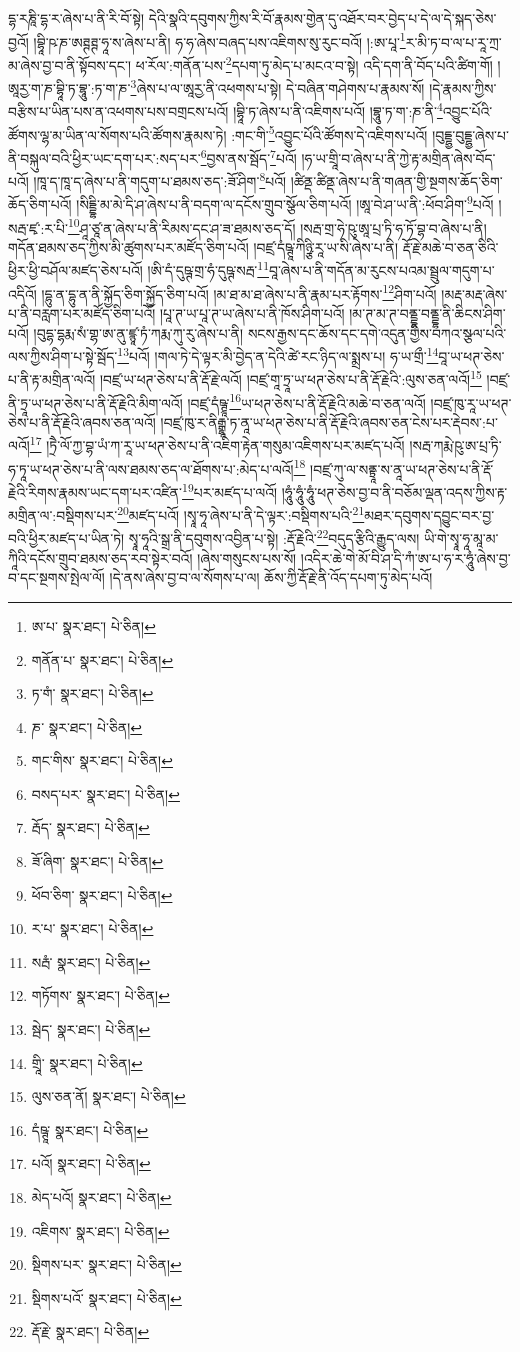 དྷ་རཎཱི་དྷ་ར་ཞེས་པ་ནི་རི་བོ་སྟེ། དེའི་སྣའི་དབུགས་ཀྱིས་རི་བོ་རྣམས་གྱེན་དུ་འཐོར་བར་བྱེད་པ་དེ་ལ་དེ་སྐད་ཅེས་བྱའོ། །བྷཱི་ཥ་ཎ་ཨཊྚཊྚ་ཧཱ་ས་ཞེས་པ་ནི། ཧ་ཧ་ཞེས་བཞད་པས་འཇིགས་སུ་རུང་བའོ། །:ཨ་པཱ་\footnote{ཨ་པ་  སྣར་ཐང་།  པེ་ཅིན། }ར་མི་ཏ་བ་ལ་པ་རཱ་ཀྲ་མ་ཞེས་བྱ་བ་ནི་སྟོབས་དང་། ཕ་རོལ་:གནོན་པས་\footnote{གནོན་པ་  སྣར་ཐང་།  པེ་ཅིན། }དཔག་ཏུ་མེད་པ་མངའ་བ་སྟེ། འདི་དག་ནི་བོད་པའི་ཚིག་གོ། །ཨཱརྱ་ག་ཎ་བྷཱི་ཏ་བྷཱུ་:ཏ་ག་ཎ་\footnote{ཏ་གཾ་  སྣར་ཐང་།  པེ་ཅིན། }ཞེས་པ་ལ་ཨཱརྱ་ནི་འཕགས་པ་སྟེ། དེ་བཞིན་གཤེགས་པ་རྣམས་སོ། །དེ་རྣམས་ཀྱིས་བརྩིས་པ་ཡིན་པས་ན་འཕགས་པས་བགྲངས་པའོ། །བྷཱི་ཏ་ཞེས་པ་ནི་འཇིགས་པའོ། །བྷཱུ་ཏ་ག་:ཎ་ནི་\footnote{ཎ་  སྣར་ཐང་།  པེ་ཅིན། }འབྱུང་པོའི་ཚོགས་ལྷ་མ་ཡིན་ལ་སོགས་པའི་ཚོགས་རྣམས་ཏེ། :གང་གི་\footnote{གང་གིས་  སྣར་ཐང་།  པེ་ཅིན། }འབྱུང་པོའི་ཚོགས་དེ་འཇིགས་པའོ། །བུདྡྷྱ་བུདྡྷྱ་ཞེས་པ་ནི་བསྐུལ་བའི་ཕྱིར་ཡང་དག་པར་:སད་པར་\footnote{བསད་པར་  སྣར་ཐང་།  པེ་ཅིན། }བྱས་ནས་སྦོད་\footnote{རྦོད་  སྣར་ཐང་།  པེ་ཅིན། }པའོ། །ཧ་ཡ་གྲཱི་བ་ཞེས་པ་ནི་ཀྱེ་རྟ་མགྲིན་ཞེས་བོད་པའོ། །ཁཱ་ད་ཁཱ་ད་ཞེས་པ་ནི་གདུག་པ་ཐམས་ཅད་:ཟོ་ཤིག་\footnote{ཟོ་ཞིག་  སྣར་ཐང་།  པེ་ཅིན། }པའོ། །ཚིནྡ་ཚིནྡ་ཞེས་པ་ནི་གཞན་གྱི་སྔགས་ཆོད་ཅིག་ཆོད་ཅིག་པའོ། །སིདྡྷི་མ་མེ་དི་ཤ་ཞེས་པ་ནི་བདག་ལ་དངོས་གྲུབ་སྩོལ་ཅིག་པའོ། །ཨཱ་བེ་ཤ་ཡ་ནི་:ཕོབ་ཤིག་\footnote{ཕོབ་ཅིག་  སྣར་ཐང་།  པེ་ཅིན། }པའོ། །སརྦ་ཛྭ་:ར་པི་\footnote{ར་པ་  སྣར་ཐང་།  པེ་ཅིན། }ཤཱ་ཙཱ་ན་ཞེས་པ་ནི་རིམས་དང་ཤ་ཟ་ཐམས་ཅད་དོ། །སརྦ་གྲ་ཧེ་ཥུ་ཨཱ་པྲ་ཏི་ཧ་ཏོ་བྷ་བ་ཞེས་པ་ནི། གདོན་ཐམས་ཅད་ཀྱིས་མི་ཚུགས་པར་མཛོད་ཅིག་པའོ། །བཛྲ་དཾཥྚཱ་ཀིཉྩི་རཱ་ཡ་སི་ཞེས་པ་ནི། རྡོ་རྗེ་མཆེ་བ་ཅན་ཅིའི་ཕྱིར་ཕྱི་བཤོལ་མཛད་ཅེས་པའོ། །ཨི་དཾ་དུཥྚ་གྲ་ཧཾ་དུཥྚ་སརྦ་\footnote{སརྦཾ་  སྣར་ཐང་།  པེ་ཅིན། }བཱ་ཞེས་པ་ནི་གདོན་མ་རུངས་པའམ་སྦྲུལ་གདུག་པ་འདིའོ། །དྷུ་ན་དྷུ་ན་ནི་སྐྱོད་ཅིག་སྐྱོད་ཅིག་པའོ། །མ་ཐ་མ་ཐ་ཞེས་པ་ནི་རྣམ་པར་རྟོགས་\footnote{གཏོགས་  སྣར་ཐང་།  པེ་ཅིན། }ཤིག་པའོ། །མརྡ་མརྡ་ཞེས་པ་ནི་བརླག་པར་མཛོད་ཅིག་པའོ། །པཱ་ཊ་ཡ་པཱ་ཊ་ཡ་ཞེས་པ་ནི་ཁོས་ཤིག་པའོ། །མ་ཊ་མ་ཊ་བནྡྷ་བནྡྷ་ནི་ཆིངས་ཤིག་པའོ། །བུདྷ་དྷརྨ་སཾ་གྷ་ཨ་ནུ་ཛྙཱ་ཏཾ་ཀརྨ་ཀུ་རུ་ཞེས་པ་ནི། སངས་རྒྱས་དང་ཆོས་དང་དགེ་འདུན་གྱིས་བཀའ་སྩལ་པའི་ལས་ཀྱིས་ཤིག་པ་སྟེ་སྦོད་\footnote{སྦེད་  སྣར་ཐང་།  པེ་ཅིན། }པའོ། །གལ་ཏེ་དེ་ལྟར་མི་བྱེད་ན་དེའི་ཚེ་རང་ཉིད་ལ་སྨྲས་པ། ཧ་ཡ་གྲྀ་\footnote{གྲཱི་  སྣར་ཐང་།  པེ་ཅིན། }བཱ་ཡ་ཕཊ་ཅེས་པ་ནི་རྟ་མགྲིན་ལའོ། །བཛྲ་ཡ་ཕཊ་ཅེས་པ་ནི་རྡོ་རྗེ་ལའོ། །བཛྲ་གཱ་ཏྲཱ་ཡ་ཕཊ་ཅེས་པ་ནི་རྡོ་རྗེའི་:ལུས་ཅན་ལའོ།\footnote{ལུས་ཅན་ནོ།  སྣར་ཐང་།  པེ་ཅིན། } །བཛྲ་ནི་ཏྲཱ་ཡ་ཕཊ་ཅེས་པ་ནི་རྡོ་རྗེའི་མིག་ལའོ། །བཛྲ་དཾཥྚྲཱ་\footnote{དཾཥྚཱ་  སྣར་ཐང་།  པེ་ཅིན། }ཡ་ཕཊ་ཅེས་པ་ནི་རྡོ་རྗེའི་མཆེ་བ་ཅན་ལའོ། །བཛྲ་ཁུ་རཱ་ཡ་ཕཊ་ཅེས་པ་ནི་རྡོ་རྗེའི་ཞབས་ཅན་ལའོ། །བཛྲ་ཁུ་ར་ནིརྒྷཱ་ཏ་ནཱ་ཡ་ཕཊ་ཅེས་པ་ནི་རྡོ་རྗེའི་ཞབས་ཅན་ངེས་པར་རྡེབས་:པ་ལའོ།\footnote{པའོ།  སྣར་ཐང་།  པེ་ཅིན། } །ཏྲཻ་ལོ་ཀྱ་བྷ་ཡཾ་ཀ་རཱ་ཡ་ཕཊ་ཅེས་པ་ནི་འཇིག་རྟེན་གསུམ་འཇིགས་པར་མཛད་པའོ། །སརྦ་ཀརྨེ་ཥུ་ཨ་པྲ་ཏི་ཧ་ཏཱ་ཡ་ཕཊ་ཅེས་པ་ནི་ལས་ཐམས་ཅད་ལ་ཐོགས་པ་:མེད་པ་ལའོ།\footnote{མེད་པའོ།  སྣར་ཐང་།  པེ་ཅིན། } །བཛྲ་ཀུ་ལ་སནྟྲཱ་ས་ནཱ་ཡ་ཕཊ་ཅེས་པ་ནི་རྡོ་རྗེའི་རིགས་རྣམས་ཡང་དག་པར་འཛིན་\footnote{འཇིགས་  སྣར་ཐང་།  པེ་ཅིན། }པར་མཛད་པ་ལའོ། །ཧཱུཾ་ཧཱུཾ་ཧཱུཾ་ཕཊ་ཅེས་བྱ་བ་ནི་བཅོམ་ལྡན་འདས་ཀྱིས་རྟ་མགྲིན་ལ་:བསྡིགས་པར་\footnote{སྡིགས་པར་  སྣར་ཐང་།  པེ་ཅིན། }མཛད་པའོ། །སྭཱ་ཧཱ་ཞེས་པ་ནི་དེ་ལྟར་:བསྡིགས་པའི་\footnote{སྡིགས་པའོ་  སྣར་ཐང་།  པེ་ཅིན། }མཐར་དབུགས་དབྱུང་བར་བྱ་བའི་ཕྱིར་མཛད་པ་ཡིན་ཏེ། སྭཱ་ཧཱའི་སྒྲ་ནི་དབུགས་འབྱིན་པ་སྟེ། :རྡོ་རྗེའི་\footnote{རྡོ་རྗེ་  སྣར་ཐང་།  པེ་ཅིན། }བདུད་རྩིའི་རྒྱུད་ལས། ཡི་གེ་སྭཱ་ཧཱ་མཱ་མ་ཀཱིའི་དངོས་གྲུབ་ཐམས་ཅད་རབ་སྟེར་བའོ། །ཞེས་གསུངས་པས་སོ། །འདིར་ཆེ་གེ་མོ་བི་ཤ་དི་ཀཾ་ཨ་པ་ཧ་ར་ཧཱུཾ་ཞེས་བྱ་བ་དང་སྔགས་སྤེལ་ལོ། །དེ་ནས་ཞེས་བྱ་བ་ལ་སོགས་པ་ལ། ཆོས་ཀྱི་རྡོ་རྗེ་ནི་འོད་དཔག་ཏུ་མེད་པའོ། 